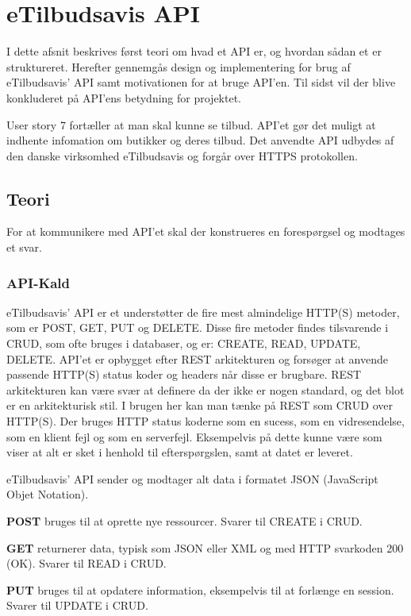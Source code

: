 \section{eTilbudsavis API}\label{api}
I dette afsnit beskrives først teori om hvad et API er, og hvordan sådan et er struktureret.
Herefter gennemgås design og implementering for brug af eTilbudsavis' API samt motivationen for at bruge API'en. 
Til sidst vil der blive konkluderet på API'ens betydning for projektet.

User story 7 fortæller at man skal kunne se tilbud.
API'et gør det muligt at indhente infomation om butikker og deres tilbud.
Det anvendte API udbydes af den danske virksomhed eTilbudsavis og forgår over HTTPS protokollen.

\subsection{Teori}
For at kommunikere med API'et skal der konstrueres en forespørgsel og modtages et svar.

\subsubsection{API-Kald}
eTilbudsavis' API er et  understøtter de fire mest almindelige HTTP(S) metoder, som er POST, GET, PUT og DELETE.
Disse fire metoder findes tilsvarende i CRUD, som ofte bruges i databaser, og er: CREATE, READ, UPDATE, DELETE.
API'et er opbygget efter REST arkitekturen og forsøger at anvende passende HTTP(S) status koder og headers når disse er brugbare.
REST arkitekturen kan være svær at definere da der ikke er nogen standard, og det blot er en arkitekturisk stil. \citep{resttwo} 
I brugen her kan man tænke på REST som CRUD over HTTP(S).
Der bruges HTTP status koderne  som en sucess,  som en vidresendelse,  som en klient fejl og  som en serverfejl. 
Eksempelvis på dette kunne være  som viser at alt er sket i henhold til efterspørgslen, samt at datet er leveret. 

eTilbudsavis' API sender og modtager alt data i formatet JSON (JavaScript Objet Notation).

\textbf{POST}
bruges til at oprette nye ressourcer.
Svarer til CREATE i CRUD.

\textbf{GET}
returnerer data, typisk som JSON eller XML og med HTTP svarkoden 200 (OK).
Svarer til READ i CRUD.

\textbf{PUT}
bruges til at opdatere information, eksempelvis til at forlænge en session.
Svarer til UPDATE i CRUD.

